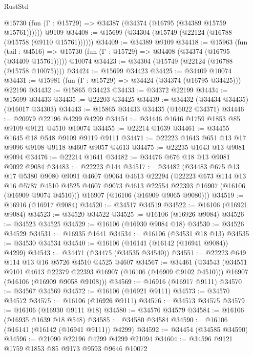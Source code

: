 \begin{lexlean}{RustStd}
\begin{coremodule}
      @15730 (fun (Γ : @15729) => @34387 (@34374 (@16795 (@34389 @15759 @15761))))))
    @9109
@34408 := @15699 (@34304 (@15749 (@22124 (@16788 (@15758 (@9110 @15761))))))
@34409 := @34389 @9109
@34418 := @15963
    (fun (tail : @4516) => @15730 (fun (Γ : @15729) => @34408 (@34374 (@16795 (@34409 @15761)))))
    @10074
@34423 := @34304 (@15749 (@22124 (@16788 (@15758 @10075))))
@34424 := @15699 @34423
@34425 := @34409 @10074
@34431 := @15981 (fun (Γ : @15729) => @34424 (@34374 (@16795 @34425))) @22196
@34432 := @15865 @34423
@34433 := @34372 @22199
@34434 := @15699 @34433
@34435 := @22203 @34425
@34439 := @34432 (@34434 @34435) (@16017 @34303)
@34443 := @15865 @34433 @34435 (@16022 @34371)
@34446 := @20979 @22196 @4299 @4299
@34454 := @34446 @1646 @1759 @1853 @85 @9109 @9121 @4510 @10074
@34455 := @22214 @1639
@34461 := @34455 @1645 @18 @548 @9109 @9119 @9111
@34471 := @22223 @1643 @651 @13 @17 @9096 @9108 @9118 @4607 @9057 @4613
@34475 := @22235 @1643 @13 @9081 @9094
@34476 := @22214 @1641
@34482 := @34476 @676 @18 @13 @9081 @9092 @9084
@34483 := @22223 @144
@34517 := @34482
    (@34483
      @675
      @13
      @17
      @5380
      @9080
      @9091
      @4607
      @9064
      @4613
      @22294
      (@22223
        @673
        @114
        @13
        @16
        @5787
        @4510
        @4525
        @4607
        @9073
        @4613
        @22554
        @22393
        @16907
        (@16106 (@16909 @9074 @4510)))
      @16907
      (@16106 (@16909 @9065 @9080)))
@34519 := @16916 (@16917 @9084)
@34520 := @34517 @34519
@34522 := @16106 (@16921 @9084)
@34523 := @34520 @34522
@34525 := @16106 (@16926 @9084)
@34526 := @34523 @34525
@34529 := @16106 (@16930 @9084 @18)
@34530 := @34526 @34529
@34531 := @16935 @1641
@34534 := @16106 (@34531 @18 @13)
@34535 := @34530 @34534
@34540 := @16106 (@16141 (@16142 (@16941 @9084)) @4299)
@34543 := @34471 (@34475 (@34535 @34540))
@34551 := @22223 @649 @114 @13 @16 @5726 @4510 @4525 @4607
@34567 := @34461
    (@34543
      (@34551 @9101 @4613 @22379 @22393 @16907 (@16106 (@16909 @9102 @4510)))
      @16907
      (@16106 (@16909 @9058 @9108)))
@34569 := @16916 (@16917 @9111)
@34570 := @34567 @34569
@34572 := @16106 (@16921 @9111)
@34573 := @34570 @34572
@34575 := @16106 (@16926 @9111)
@34576 := @34573 @34575
@34579 := @16106 (@16930 @9111 @18)
@34580 := @34576 @34579
@34584 := @16106 (@16935 @1639 @18 @548)
@34585 := @34580 @34584
@34590 := @16106 (@16141 (@16142 (@16941 @9111)) @4299)
@34592 := @34454 (@34585 @34590)
@34596 := @21090 @22196 @4299 @4299 @21094
@34604 := @34596 @9121 @1759 @1853 @85 @9173 @9593 @9646 @10072

\end{coremodule}
\end{lexlean}
